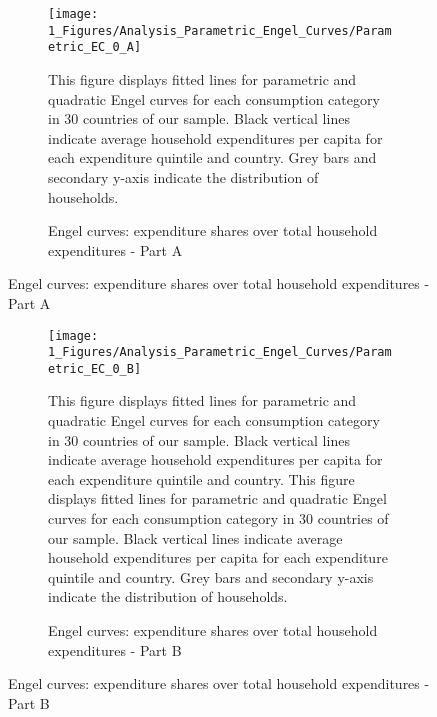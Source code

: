 \begin{figure}[ht!]
  \centering
  \caption{Engel curves: expenditure shares over total household expenditures} \label{fig:Engel}
  \begin{subfigure}[b]{\textwidth}
  \centering
    \caption{Engel curves: expenditure shares over total household expenditures - Part A} \label{fig:Engel_1}
  \texttt{[image: 1\_Figures/Analysis\_Parametric\_Engel\_Curves/Parametric\_EC\_0\_A]}
  \begin{subcaption2}
    This figure displays fitted lines for parametric and quadratic Engel curves for each consumption category in 30 countries of our sample. Black vertical lines indicate average household expenditures per capita for each expenditure quintile and country. Grey bars and secondary y-axis indicate the distribution of households.
  \end{subcaption2}
  \end{subfigure}
\end{figure}

\clearpage

\begin{figure}[ht!]\ContinuedFloat
   \begin{subfigure}[b]{\textwidth}
  \centering
      \caption{Engel curves: expenditure shares over total household expenditures - Part B} \label{fig:Engel_2}
  \texttt{[image: 1\_Figures/Analysis\_Parametric\_Engel\_Curves/Parametric\_EC\_0\_B]}
  \begin{subcaption2}
    This figure displays fitted lines for parametric and quadratic Engel curves for each consumption category in 30 countries of our sample. Black vertical lines indicate average household expenditures per capita for each expenditure quintile and country. This figure displays fitted lines for parametric and quadratic Engel curves for each consumption category in 30 countries of our sample. Black vertical lines indicate average household expenditures per capita for each expenditure quintile and country. Grey bars and secondary y-axis indicate the distribution of households.
  \end{subcaption2}
\end{subfigure}
\end{figure}

\clearpage

